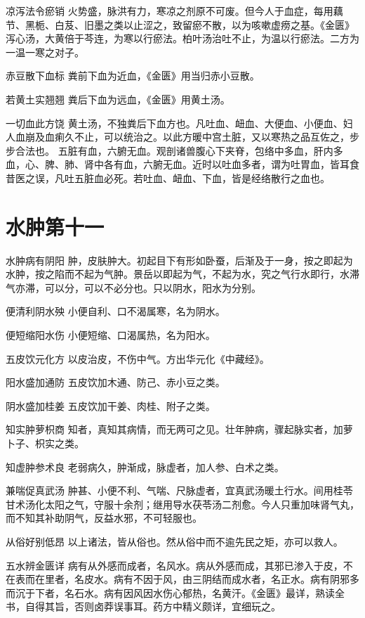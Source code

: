 \documentclass[a4paper,12pt,UTF8,twoside]{ctexbook}
\begin{document}
    凉泻法令瘀销
    火势盛，脉洪有力，寒凉之剂原不可废。但今人于血症，每用藕节、黑栀、白芨、旧墨之类以止涩之，致留瘀不散，以为咳嗽虚痨之基。《金匮》泻心汤，大黄倍于芩连，为寒以行瘀法。柏叶汤治吐不止，为温以行瘀法。二方为一温一寒之对子。
    
    赤豆散下血标
    粪前下血为近血，《金匮》用当归赤小豆散。
    
    若黄土实翘翘
    粪后下血为远血，《金匮》用黄土汤。
    
    一切血此方饶
    黄土汤，不独粪后下血方也。凡吐血、衄血、大便血、小便血、妇人血崩及血痢久不止，可以统治之。以此方暖中宫土脏，又以寒热之品互佐之，步步合法也。
    五脏有血，六腑无血。观剖诸兽腹心下夹脊，包络中多血，肝内多血，心、脾、肺、肾中各有血，六腑无血。近时以吐血多者，谓为吐胃血，皆耳食昔医之误，凡吐五脏血必死。若吐血、衄血、下血，皆是经络散行之血也。
    
    \chapter{水肿第十一}
    
    水肿病有阴阳
    肿，皮肤肿大。初起目下有形如卧蚕，后渐及于一身，按之即起为水肿，按之陷而不起为气肿。景岳以即起为气，不起为水，究之气行水即行，水滞气亦滞，可以分，可以不必分也。只以阴水，阳水为分别。
    
    便清利阴水殃
    小便自利、口不渴属寒，名为阴水。
    
    便短缩阳水伤
    小便短缩、口渴属热，名为阳水。
    
    五皮饮元化方
    以皮治皮，不伤中气。方出华元化《中藏经》。
    
    阳水盛加通防
    五皮饮加木通、防己、赤小豆之类。
    
    阴水盛加桂姜
    五皮饮加干姜、肉桂、附子之类。
    
    知实肿萝枳商
    知者，真知其病情，而无两可之见。壮年肿病，骤起脉实者，加萝卜子、枳实之类。
    
    知虚肿参术良
    老弱病久，肿渐成，脉虚者，加人参、白术之类。
    
    兼喘促真武汤
    肿甚、小便不利、气喘、尺脉虚者，宜真武汤暖土行水。间用桂苓甘术汤化太阳之气，守服十余剂；继用导水茯苓汤二剂愈。今人只重加味肾气丸，而不知其补助阴气，反益水邪，不可轻服也。
    
    从俗好别低昂
    以上诸法，皆从俗也。然从俗中而不逾先民之矩，亦可以救人。
    
    五水辨金匮详
    病有从外感而成者，名风水。病从外感而成，其邪已渗入于皮，不在表而在里者，名皮水。病有不因于风，由三阴结而成水者，名正水。病有阴邪多而沉于下者，名石水。病有因风因水伤心郁热，名黄汗。《金匮》最详，熟读全书，自得其旨，否则卤莽误事耳。药方中精义颇详，宜细玩之。
    
\end{document}
